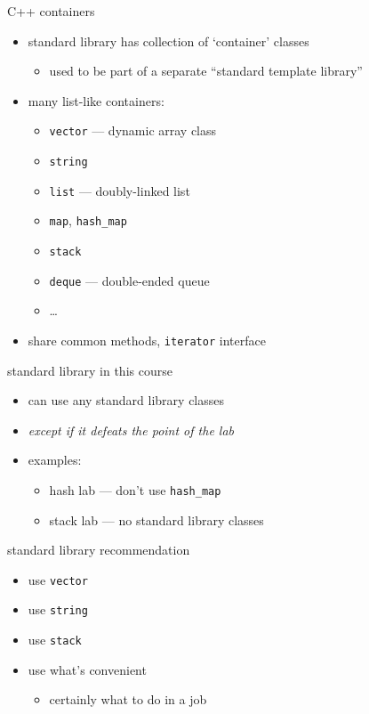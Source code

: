 \begin{frame}{C++ containers}
    \begin{itemize}
    \item standard library has collection of `container' classes
        \begin{itemize}
        \item used to be part of a separate ``standard template library''
        \end{itemize}
    \item many list-like containers:
        \begin{itemize}
        \item \texttt{vector} --- dynamic array class
        \item \texttt{string}
        \item \texttt{list} --- doubly-linked list
        \item \texttt{map}, \texttt{hash\_map}
        \item \texttt{stack}
        \item \texttt{deque} --- double-ended queue
        \item \ldots
        \end{itemize}
    \item share common methods, \texttt{iterator} interface
    \end{itemize}
\end{frame}

\begin{frame}{standard library in this course}
    \begin{itemize}
    \item can use any standard library classes
    \item \textit{except if it defeats the point of the lab}
    \item examples:
        \begin{itemize}
        \item hash lab --- don't use \texttt{hash\_map}
        \item stack lab --- no standard library classes
        \end{itemize}
    \end{itemize}
\end{frame}

\begin{frame}{standard library recommendation}
    \begin{itemize}
        \item use \texttt{vector}
        \item use \texttt{string}
        \item use \texttt{stack}
        \item use what's convenient
            \begin{itemize}
            \item certainly what to do in a job
            \end{itemize}
    \end{itemize}
\end{frame}

